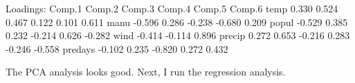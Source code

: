 \documentclass[
]{article}
\newenvironment{Shaded}{\begin{snugshade}}{\end{snugshade}}
\newcommand{\FloatTok}[1]{\textcolor[rgb]{0.00,0.00,0.81}{#1}}
\newcommand{\NormalTok}[1]{#1}
\newcommand{\SpecialCharTok}[1]{\textcolor[rgb]{0.00,0.00,0.00}{#1}}
\begin{document}
\begin{Shaded}
\begin{Highlighting}[]
\NormalTok{Loadings}\SpecialCharTok{:}
\NormalTok{        Comp}\FloatTok{.1}\NormalTok{ Comp}\FloatTok{.2}\NormalTok{ Comp}\FloatTok{.3}\NormalTok{ Comp}\FloatTok{.4}\NormalTok{ Comp}\FloatTok{.5}\NormalTok{ Comp}\FloatTok{.6}
\NormalTok{temp     }\FloatTok{0.330}  \FloatTok{0.524}  \FloatTok{0.467}  \FloatTok{0.122}  \FloatTok{0.101}  \FloatTok{0.611}
\NormalTok{manu    }\SpecialCharTok{{-}}\FloatTok{0.596}  \FloatTok{0.286}        \SpecialCharTok{{-}}\FloatTok{0.238} \SpecialCharTok{{-}}\FloatTok{0.680}  \FloatTok{0.209}
\NormalTok{popul   }\SpecialCharTok{{-}}\FloatTok{0.529}  \FloatTok{0.385}  \FloatTok{0.232} \SpecialCharTok{{-}}\FloatTok{0.214}  \FloatTok{0.626} \SpecialCharTok{{-}}\FloatTok{0.282}
\NormalTok{wind    }\SpecialCharTok{{-}}\FloatTok{0.414} \SpecialCharTok{{-}}\FloatTok{0.114}         \FloatTok{0.896}              
\NormalTok{precip   }\FloatTok{0.272}  \FloatTok{0.653} \SpecialCharTok{{-}}\FloatTok{0.216}  \FloatTok{0.283} \SpecialCharTok{{-}}\FloatTok{0.246} \SpecialCharTok{{-}}\FloatTok{0.558}
\NormalTok{predays }\SpecialCharTok{{-}}\FloatTok{0.102}  \FloatTok{0.235} \SpecialCharTok{{-}}\FloatTok{0.820}         \FloatTok{0.272}  \FloatTok{0.432}
\end{Highlighting}
\end{Shaded}

The PCA analysis looks good. Next, I run the regression analysis.
\end{document}

